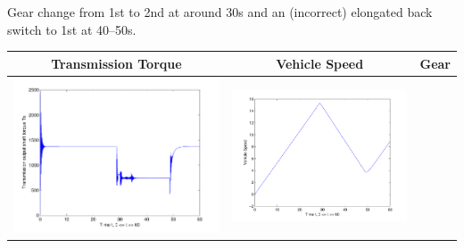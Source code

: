 \documentclass{seminar}
\begin{document}
\begin{slide}
Gear change from 1st to 2nd at around 30s and 
an (incorrect) elongated back switch to 1st at 40--50s.
\end{slide}
\begin{slide}
\begin{tabular}{ccc}
Transmission Torque & Vehicle Speed & Gear
\\ \hline
\includegraphics[angle=0,scale=0.22]{Ts-tps80-grade2-2} &
\includegraphics[angle=0,scale=0.22]{V-tps80-grade2-2} &

\end{tabular}
\end{slide}
\end{document}
